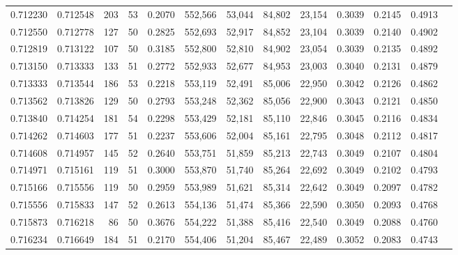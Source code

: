 \begin{tabular}{rrrrrrrrrrrrr}
0.712230 & 0.712548 &    203 &    53 &                                     0.2070 & 552,566 &  53,044 &  84,802 &  23,154 & 0.3039 & 0.2145 & 0.4913 \\
0.712550 & 0.712778 &    127 &    50 &                                     0.2825 & 552,693 &  52,917 &  84,852 &  23,104 & 0.3039 & 0.2140 & 0.4902 \\
0.712819 & 0.713122 &    107 &    50 &                                     0.3185 & 552,800 &  52,810 &  84,902 &  23,054 & 0.3039 & 0.2135 & 0.4892 \\
0.713150 & 0.713333 &    133 &    51 &                                     0.2772 & 552,933 &  52,677 &  84,953 &  23,003 & 0.3040 & 0.2131 & 0.4879 \\
0.713333 & 0.713544 &    186 &    53 &                                     0.2218 & 553,119 &  52,491 &  85,006 &  22,950 & 0.3042 & 0.2126 & 0.4862 \\
0.713562 & 0.713826 &    129 &    50 &                                     0.2793 & 553,248 &  52,362 &  85,056 &  22,900 & 0.3043 & 0.2121 & 0.4850 \\
0.713840 & 0.714254 &    181 &    54 &                                     0.2298 & 553,429 &  52,181 &  85,110 &  22,846 & 0.3045 & 0.2116 & 0.4834 \\
0.714262 & 0.714603 &    177 &    51 &                                     0.2237 & 553,606 &  52,004 &  85,161 &  22,795 & 0.3048 & 0.2112 & 0.4817 \\
0.714608 & 0.714957 &    145 &    52 &                                     0.2640 & 553,751 &  51,859 &  85,213 &  22,743 & 0.3049 & 0.2107 & 0.4804 \\
0.714971 & 0.715161 &    119 &    51 &                                     0.3000 & 553,870 &  51,740 &  85,264 &  22,692 & 0.3049 & 0.2102 & 0.4793 \\
0.715166 & 0.715556 &    119 &    50 &                                     0.2959 & 553,989 &  51,621 &  85,314 &  22,642 & 0.3049 & 0.2097 & 0.4782 \\
0.715556 & 0.715833 &    147 &    52 &                                     0.2613 & 554,136 &  51,474 &  85,366 &  22,590 & 0.3050 & 0.2093 & 0.4768 \\
0.715873 & 0.716218 &     86 &    50 &                                     0.3676 & 554,222 &  51,388 &  85,416 &  22,540 & 0.3049 & 0.2088 & 0.4760 \\
0.716234 & 0.716649 &    184 &    51 &                                     0.2170 & 554,406 &  51,204 &  85,467 &  22,489 & 0.3052 & 0.2083 & 0.4743 \\

\end{tabular}
